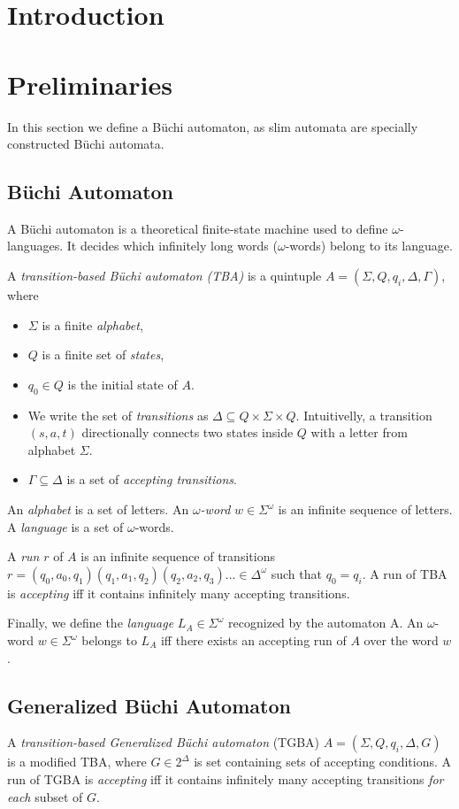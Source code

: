 \documentclass[
	digital
nolof, nolot
]{fithesis3}
\begin{document}
	\chapter{Introduction}
	\chapter{Preliminaries}
		In this section we define a Büchi automaton, as slim automata are specially constructed Büchi automata.
		\section{Büchi Automaton}
			A Büchi automaton is a theoretical finite-state machine used to define $\omega$-languages. It decides which infinitely long words ($\omega$-words) belong to its language.
			
			A \emph{transition-based Büchi automaton (TBA)} is a quintuple $A=(\Sigma, Q, q_i, \Delta, \Gamma)$, where 
			\begin{itemize}
				\item $\Sigma$ is a finite \emph{alphabet},
				\item $Q$ is a finite set of \emph{states},
				\item $q_0 \in Q$ is the initial state of $A$.
				\item We write the set of \emph{transitions} as $\Delta \subseteq Q \times \Sigma \times Q$. Intuitivelly, a transition $(s, a, t)$  directionally connects two states inside $Q$ with a letter from alphabet $\Sigma$. 
				\item $\Gamma \subseteq \Delta$ is a set of \emph{accepting transitions}.
			\end{itemize}

			 An \emph{alphabet} is a set of letters. An \emph{$\omega$-word} $w \in \Sigma^\omega$ is an infinite sequence of letters. A \emph{language} is a set of $\omega$-words.
			
			A \emph{run} $r$ of $A$ is an infinite sequence of transitions
			$r=(q_0, a_0, q_1)(q_1, a_1, q_2)(q_2, a_2, q_3)\ldots\in\Delta^\omega$ such that $q_0=q_i$.
			A run of TBA is \emph{accepting} iff it contains infinitely many accepting transitions.

			Finally, we define the \emph{language} $L_A \in \Sigma^\omega$ recognized by the automaton A. An $\omega$-word $w \in \Sigma^\omega$ belongs to $L_A$ iff there exists an accepting run of $A$ over the word $w$. 
			
		\section{Generalized Büchi Automaton}
		A \emph{transition-based Generalized Büchi automaton} (TGBA) $A=(\Sigma, Q, q_i, \Delta, G)$ is a modified TBA, where $G \in 2^\Delta$ is set containing sets of accepting conditions. A run of TGBA is \emph{accepting} iff it contains infinitely many accepting transitions \emph{for each} subset of $G$. 
		
\end{document}
